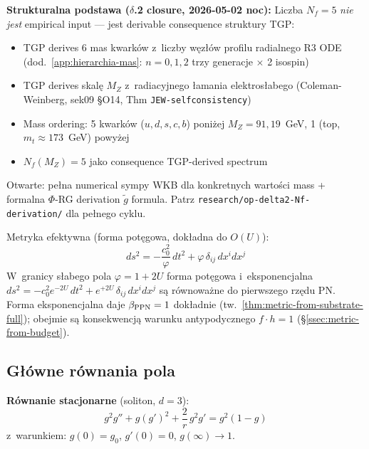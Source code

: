 \medskip\noindent
\textbf{Strukturalna podstawa ($\delta$.2 closure, 2026-05-02 noc):}
Liczba $N_f = 5$ \emph{nie jest} empirical input --- jest derivable
consequence struktury TGP:
\begin{itemize}[nosep]
  \item TGP derives 6 mas kwark\'ow z~liczby w\k{e}z\l{}\'ow profilu radialnego
        R3 ODE (dod.~\ref{app:hierarchia-mas}: $n=0,1,2$ trzy generacje
        $\times$ 2 isospin)
  \item TGP derives skal\k{e} $M_Z$ z~radiacyjnego \l{}amania
        elektros\l{}abego (Coleman-Weinberg, sek09 §O14, Thm
        \texttt{JEW-selfconsistency})
  \item Mass ordering: 5 kwark\'ow ($u, d, s, c, b$) poni\.zej $M_Z = 91{,}19$~GeV,
        1 (top, $m_t \approx 173$~GeV) powy\.zej
  \item $N_f(M_Z) = 5$ jako consequence TGP-derived spectrum
\end{itemize}
Otwarte: pe\l{}na numerical sympy WKB dla konkretnych warto\'sci mass
+ formalna $\Phi$-RG derivation $\tilde{g}$ formula. Patrz
\texttt{research/op-delta2-Nf-derivation/} dla pe\l{}nego cyklu.

\noindent Metryka efektywna (forma pot\k{e}gowa, dok\l{}adna do $O(U)$):
\begin{equation}
ds^2 = -\frac{c_0^2}{\varphi}\,dt^2 + \varphi\,\delta_{ij}\,dx^i dx^j
\end{equation}
W~granicy s\l{}abego pola $\varphi = 1 + 2U$ forma pot\k{e}gowa
i~eksponencjalna
$ds^2 = -c_0^2 e^{-2U}\,dt^2 + e^{+2U}\,\delta_{ij}\,dx^i dx^j$
s\k{a} r\'ownowa\.zne do pierwszego rz\k{e}du PN.
Forma eksponencjalna daje $\beta_{\rm PPN} = 1$ dok\l{}adnie
(tw.~\ref{thm:metric-from-substrate-full});
obe\-jmie s\k{a} konsekwencj\k{a} warunku antypodycznego
$f \cdot h = 1$ (\S\ref{ssec:metric-from-budget}).

\subsection*{G\l{}\'owne r\'ownania pola}

\noindent\textbf{R\'ownanie stacjonarne} (soliton, $d=3$):
\begin{equation}
g^2 g'' + g(g')^2 + \frac{2}{r}\,g^2 g' = g^2(1 - g)
\end{equation}
z~warunkiem: $g(0) = g_0$, $g'(0) = 0$, $g(\infty) \to 1$.

\smallskip\noindent
{}

